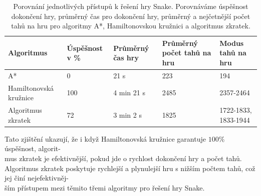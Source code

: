\begin{table}[h!]
\centering
\begin{tabular}{ | p{} || p{} | p{2cm} | p{2cm} | p{2cm} |  }
 \hline
 Algoritmus & Úspěšnost v \% & Průměrný čas hry & Průměrný počet tahů na hru & Modus tahů na hru \\
 \hline
 A*  & 0 & 21 s & 223 & 194 \\
 Hamiltonovská kružnice & 100 & 4 min 21 s & 2485 & 2357-2464 \\
 Algoritmus zkratek & 72 & 3 min 2 s & 1825 & 1722-1833, 1833-1944 \\
 \hline
\end{tabular}
\caption{Porovnání jednotlivých přístupů k řešení hry Snake. Porovnáváme úspěšnost dokončení hry, průměrný čas pro dokončení hry, průměrný a nejčetnější počet tahů na hru pro algoritmy A*, Hamiltonovskou kružnici a algoritmus zkratek.}
\label{table:PorovnaniPristupu}
\end{table}

Tato zjištění ukazují, že i když Hamiltonovská kružnice garantuje \(100\%\) úspěšnost, algorit-\\mus zkratek je efektivnější, pokud jde o rychlost dokončení hry a počet tahů. Algoritmus zkratek poskytuje rychlejší a plynulejší hru s nižším počtem tahů, což jej činí nejefektivněj-\\ším přístupem mezi těmito třemi algoritmy pro řešení hry Snake.
